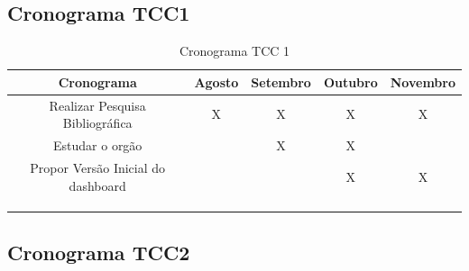 \subsection{Cronograma TCC1}
\begin{table}[http]
	\centering
	\caption{Cronograma TCC 1}
	\label{tab:cronograma}
	\begin{tabular}{ccccc}
		\hline
		\multicolumn{1}{|c|}{\textbf{Cronograma}}             & \multicolumn{1}{c|}{\textbf{Agosto}} & \multicolumn{1}{c|}{\textbf{Setembro}} & \multicolumn{1}{c|}{\textbf{Outubro}} & \multicolumn{1}{c|}{\textbf{Novembro}} \\ \hline
		\multicolumn{1}{|c|}{Realizar Pesquisa Bibliográfica} & \multicolumn{1}{c|}{X}              & \multicolumn{1}{c|}{X}              & \multicolumn{1}{c|}{X}             & \multicolumn{1}{c|}{X}              \\ \hline
		\multicolumn{1}{|c|}{Estudar o orgão}             & \multicolumn{1}{c|}{}               & \multicolumn{1}{c|}{X}              & \multicolumn{1}{c|}{X}             & \multicolumn{1}{c|}{}               \\ \hline
		\multicolumn{1}{|c|}{Propor Versão Inicial do dashboard}                & \multicolumn{1}{c|}{}               & \multicolumn{1}{c|}{}               & \multicolumn{1}{c|}{X}             & \multicolumn{1}{c|}{X}              \\ \hline
		\multicolumn{1}{l}{}                                  & \multicolumn{1}{l}{}                & \multicolumn{1}{l}{}                & \multicolumn{1}{l}{}               & \multicolumn{1}{l}{}                \\
		\multicolumn{1}{l}{}                                  & \multicolumn{1}{l}{}                & \multicolumn{1}{l}{}                & \multicolumn{1}{l}{}               & \multicolumn{1}{l}{}                \\
		\multicolumn{1}{l}{}                                  & \multicolumn{1}{l}{}                & \multicolumn{1}{l}{}                & \multicolumn{1}{l}{}               & \multicolumn{1}{l}{}               
	\end{tabular}
\end{table}

\subsection{Cronograma TCC2}

